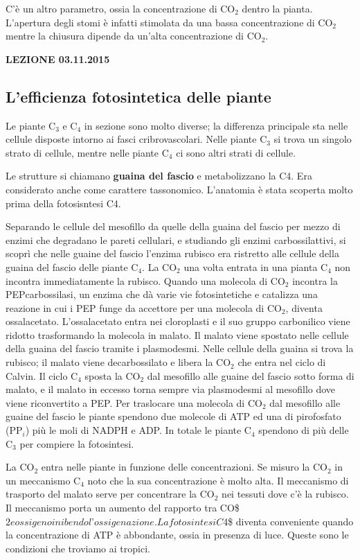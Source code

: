 \documentclass[]{article}
\begin{document}
C'è un altro parametro, ossia la concentrazione di CO$_2$ dentro la
pianta. L'apertura degli stomi è infatti stimolata da una bassa
concentrazione di CO$_2$ mentre la chiusura dipende da un'alta
concentrazione di CO$_2$.

\textbf{LEZIONE 03.11.2015}

\subsection{L'efficienza fotosintetica delle
piante}\label{lefficienza-fotosintetica-delle-piante}

Le piante C$_3$ e C$_4$ in sezione sono molto diverse; la differenza
principale sta nelle cellule disposte intorno ai fasci cribrovascolari.
Nelle piante C$_3$ si trova un singolo strato di cellule, mentre nelle
piante C$_4$ ci sono altri strati di cellule.

Le strutture si chiamano \textbf{guaina del fascio} e metabolizzano la
C4. Era considerato anche come carattere tassonomico. L'anatomia è stata
scoperta molto prima della fotosisntesi C4.

Separando le cellule del mesofillo da quelle della guaina del fascio per
mezzo di enzimi che degradano le pareti cellulari, e studiando gli
enzimi carbossilattivi, si scoprì che nelle guaine del fascio l'enzima
rubisco era ristretto alle cellule della guaina del fascio delle piante
C$_4$. La CO$_2$ una volta entrata in una pianta C$_4$ non incontra
immediatamente la rubisco. Quando una molecola di CO$_2$ incontra la
PEPcarbossilasi, un enzima che dà varie vie fotosintetiche e catalizza
una reazione in cui i PEP funge da accettore per una molecola di CO$_2$,
diventa ossalacetato. L'ossalacetato entra nei cloroplasti e il suo
gruppo carbonilico viene ridotto trasformando la molecola in malato. Il
malato viene spostato nelle cellule della guaina del fascio tramite i
plasmodesmi. Nelle cellule della guaina si trova la rubisco; il malato
viene decarbossilato e libera la CO$_2$ che entra nel ciclo di Calvin.
Il ciclo C$_4$ sposta la CO$_2$ dal mesofillo alle guaine del fascio
sotto forma di malato, e il malato in eccesso torna sempre via
plasmodesmi al mesofillo dove viene riconvertito a PEP. Per traslocare
una molecola di CO$_2$ dal mesofillo alle guaine del fascio le piante
spendono due molecole di ATP ed una di pirofosfato (PP$_i$) più le moli
di NADPH e ADP. In totale le piante C$_4$ spendono di più delle C$_3$
per compiere la fotosintesi.

La CO$_2$ entra nelle piante in funzione delle concentrazioni. Se misuro
la CO$_2$ in un meccanismo C$_4$ noto che la sua concentrazione è molto
alta. Il meccanismo di trasporto del malato serve per concentrare la
CO$_2$ nei tessuti dove c'è la rubisco. Il meccanismo porta un aumento
del rapporto tra
CO\$\emph{$2 e ossigeno inibendo l’ossigenazione. La fotosintesi C$}4\$
diventa conveniente quando la concentrazione di ATP è abbondante, ossia
in presenza di luce. Queste sono le condizioni che troviamo ai tropici.
\end{document}
